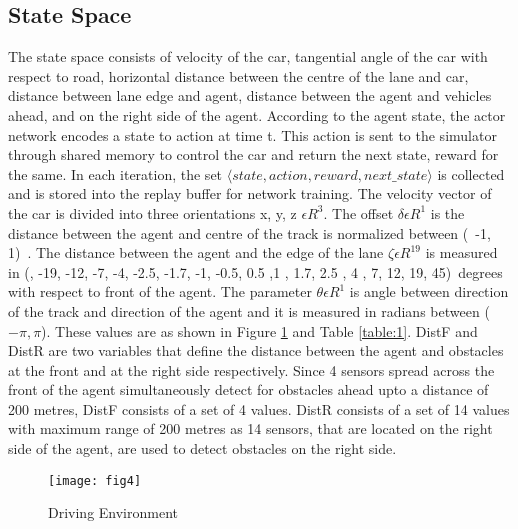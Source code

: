 \subsection{State Space}
The state space consists of velocity of the car, tangential angle of the car with respect to road, horizontal distance between the centre of the lane and car, distance between lane edge and agent, distance between the agent and vehicles ahead, and on the right side of the agent.
According to the agent state, the actor network encodes a state to action at time t. This action is sent to the simulator through shared memory to control the car and return the next state, reward for the same. In each iteration, the set $\langle state, action, reward, next\_state \rangle $
is collected and is stored into the replay buffer for network training. The velocity vector of the car is divided into three orientations x, y, z 
$\epsilon R^3$. The offset $\delta \epsilon R^1$ is the distance between the agent and centre of the track is normalized between (\ -1, 1)\ . The distance between the agent and the edge of the lane $\zeta \epsilon R^{19}$ is measured in (, -19, -12, -7, -4, -2.5, -1.7, -1, -0.5, 0.5 ,1 , 1.7, 2.5 , 4 , 7, 12, 19, 45)\ degrees with respect to front of the agent. The parameter $\theta  \epsilon R^1 $ is angle between direction of the track and direction of the agent and it is measured in radians between (\ $ -\pi, \pi$). 
These values are as shown in Figure \ref{fig:envt} and Table \ref{table:1}. 
DistF and DistR are two variables that define the distance between the agent and obstacles at the front and at the right side respectively. Since 4 sensors spread across the front of the agent simultaneously detect for obstacles ahead  upto a distance of 200 metres, DistF consists of a set of 4 values. DistR consists of a set of 14 values with maximum range of 200 metres as 14 sensors, that are located on the right side of the agent, are used to detect obstacles on the right side.



\begin{figure}[h]
	\centering
	\texttt{[image: fig4]}
	\caption{Driving Environment \cite{huang2019end} }
	\label{fig:envt}
\end{figure}


